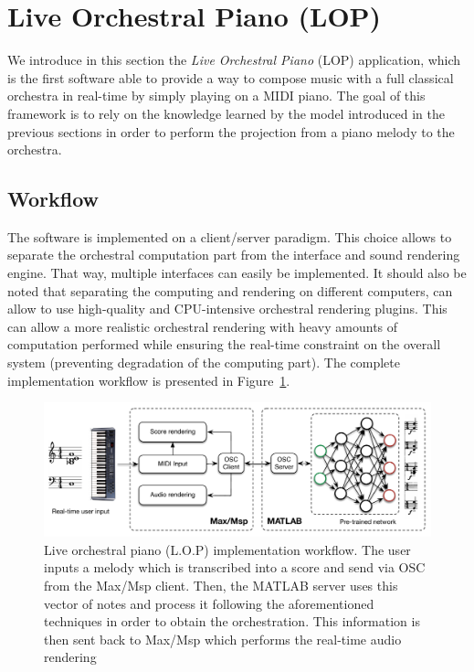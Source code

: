 \documentclass{article}
\begin{document}
\section{Live Orchestral Piano (LOP)}
We introduce in this section the \emph{Live Orchestral Piano} (LOP)
application, which is the first software able to provide a way to
compose music with a full classical orchestra in real-time by simply
playing on a MIDI piano. The goal of this framework is to rely on
the knowledge learned by the model introduced in the previous sections
in order to perform the projection from a piano melody to the orchestra.

\subsection{Workflow}
The software is implemented on a client/server paradigm. This choice
allows to separate the orchestral computation part from the interface
and sound rendering engine. That way, multiple interfaces can easily
be implemented. It should also be noted that separating the computing
and rendering on different computers, can allow to use high-quality
and CPU-intensive orchestral rendering plugins. This can allow a more
realistic orchestral rendering with heavy amounts of computation performed
while ensuring the real-time constraint on the overall system (preventing
degradation of the computing part). The complete implementation workflow
is presented in Figure~\ref{fig:Live-orchestral-piano}.

\begin{figure}
\begin{centering}
\includegraphics[scale=0.55]{workflow}
\par\end{centering}

\caption{\label{fig:Live-orchestral-piano}Live orchestral piano (L.O.P) implementation
workflow. The user inputs a melody which is transcribed into a score
and send via OSC from the Max/Msp client. Then, the MATLAB server
uses this vector of notes and process it following the aforementioned
techniques in order to obtain the orchestration. This information
is then sent back to Max/Msp which performs the real-time audio rendering }
\end{figure}
\end{document}
